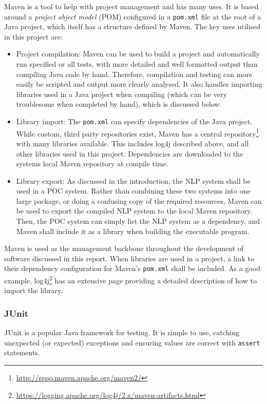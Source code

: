 Maven is a tool to help with project management and has many uses. It is based around a \textit{project object model} (POM) configured in a \texttt{pom.xml} file at the root of a Java project, which itself has a structure defined by Maven. The key uses utilised in this project are:
\begin{itemize}
	\item Project compilation: Maven can be used to build a project and automatically run specified or all tests, with more detailed and well formatted output than compiling Java code by hand. Therefore, compilation and testing can more easily be scripted and output more clearly analysed. It also handles importing libraries used in a Java project when compiling (which can be very troublesome when completed by hand), which is discussed below.
	\item Library import: The \texttt{pom.xml} can specify dependencies of the Java project. While custom, third party repositories exist, Maven has a central repository\footnote{\href{http://repo.maven.apache.org/maven2/}{http://repo.maven.apache.org/maven2/}} with many libraries available. This includes log4j described above, and all other libraries used in this project. Dependencies are downloaded to the systems local Maven repository at compile time.
	\item Library export: As discussed in the introduction, the NLP system shall be used in a POC system. Rather than combining these two systems into one large package, or doing a confusing copy of the required resources, Maven can be used to export the compiled NLP system to the local Maven repository. Then, the POC system can simply list the NLP system as a dependency, and Maven shall include it as a library when building the executable program.
\end{itemize}

Maven is used as the management backbone throughout the development of software discussed in this report. When libraries are used in a project, a link to their dependency configuration for Maven's \texttt{pom.xml} shall be included. As a good example, log4j\footnote{\href{https://logging.apache.org/log4j/2.x/maven-artifacts.html}{https://logging.apache.org/log4j/2.x/maven-artifacts.html}} has an extensive page providing a detailed description of how to import the library.

\subsubsection*{JUnit}
JUnit is a popular Java framework for testing. It is simple to use, catching unexpected (or expected) exceptions and ensuring values are correct with \texttt{assert} statements. 

